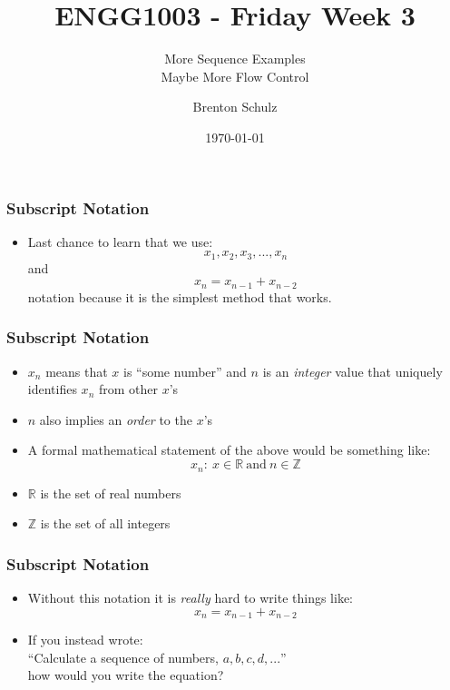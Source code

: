 \documentclass[14pt]{beamer}
\title{ENGG1003 - Friday Week 3}
\subtitle{More Sequence Examples\\Maybe More Flow Control}
\author{Brenton Schulz}
\institute{University of Newcastle}
\date{\today}
\begin{document}
\titlepage

\begin{frame}
\frametitle{Subscript Notation}
\begin{itemize}
\item Last chance to learn that we use:
\begin{equation}
x_1, x_2, x_3, ... , x_n
\end{equation}
and
\begin{equation}
x_n = x_{n-1} + x_{n-2}
\end{equation}
notation because it is the simplest method that works.
\end{itemize}
\end{frame}

\begin{frame}[fragile]
\frametitle{Subscript Notation}
\begin{itemize}
\item $x_n$ means that $x$ is ``some number'' and $n$ is an \textit{integer} value that uniquely identifies $x_n$ from other $x$'s
\item $n$ also implies an \textit{order} to the $x$'s
\item A formal mathematical statement of the above would be something like:
\begin{equation}
x_n :~x \in \mathbb{R}~\textrm{and} ~ n \in \mathbb{Z}
\end{equation}
\item $\mathbb{R}$ is the set of real numbers
\item $\mathbb{Z}$ is the set of all integers
\end{itemize}
\end{frame}

\begin{frame}[fragile]
\frametitle{Subscript Notation}
\begin{itemize}
\item Without this notation it is \textit{really} hard to write things like:
\begin{equation}
x_n = x_{n-1} + x_{n-2}
\end{equation}
\item If you instead wrote:\\
``Calculate a sequence of numbers, $a,b,c,d,...$''\\
how would you write the equation?
\end{itemize}
\end{frame}
\end{document}

